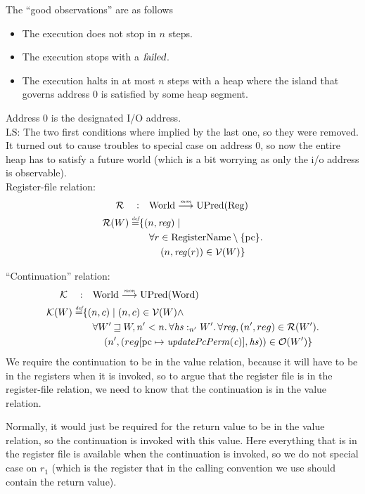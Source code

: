 \documentclass{article}
\newcommand{\update}[2]{[#1 \mapsto #2]}
\newcommand{\monfun}{\stackrel{\textit{\tiny{mon}}}{\longrightarrow}}
\newcommand{\defeq}{\stackrel{\textit{\tiny{def}}}{=}}
\newcommand\lau[1]{{\color{purple} \sf \footnotesize {LS: #1}}\\}
\newcommand{\var}[1]{\mathit{#1}}
\newcommand{\hs}{\var{hs}}
\newcommand{\pcreg}{\mathrm{pc}}
\newcommand{\reg}{\var{reg}}
\newcommand{\heap}{\var{heap}}
\newcommand{\failed}{\textsl{failed}}
\newcommand{\plainfun}[2]{
  \ifthenelse{\equal{#2}{}}
             {\mathit{#1}}
             {\mathit{#1}(#2)}
}
\newcommand{\updatePcPerm}[1]{\plainfun{updatePcPerm}{#1}}
\newcommand{\future}{\mathbin{\sqsupseteq}}
\newcommand{\heapSat}[3][\heap]{#1 :_{#2} #3}
\newcommand{\asmType}{\plaindom{AsmType}}
\newcommand{\plaindom}[1]{\mathrm{#1}}
\newcommand{\Words}{\plaindom{Word}}
\newcommand{\RegName}{\plaindom{RegisterName}}
\newcommand{\Regs}{\plaindom{Reg}}
\newcommand{\Worlds}{\plaindom{World}}
\newcommand{\UPred}[1]{\plaindom{UPred}(#1)}
\newcommand{\intr}[2]{\mathcal{#1}}
\newcommand{\valueintr}[1]{\intr{V}{#1}}
\newcommand{\contintr}[1]{\intr{K}{#1}}
\newcommand{\regintr}[1]{\intr{R}{#1}}
\newcommand{\stdvr}{\valueintr{\asmType}}
\newcommand{\stdrr}{\regintr{\asmType}}
\newcommand{\stdkr}{\contintr{\asmType}}
\newcommand{\observations}{\mathcal{O}}
\newcommand{\npair}[2][n]{\left(#1,#2 \right)}
\begin{document}
The ``good observations'' are as follows
\begin{itemize}
\item The execution does not stop in $n$ steps. 
\item The execution stops with a $\failed$.
\item The execution halts in at most $n$ steps with a heap where the island that governs address 0 is satisfied by some heap segment.
\end{itemize}
Address 0 is the designated I/O address.
\\ \lau{The two first conditions where implied by the last one, so they were removed. It turned out to cause troubles to special case on address 0, so now the entire heap has to satisfy a future world (which is a bit worrying as only the i/o address is observable).}

Register-file relation:
\begin{align*}
  \stdrr \quad : & \quad \Worlds \monfun \UPred{\Regs} \\
  \stdrr(W) \defeq & \{ \npair{\reg} \mid \\
                    & \quad \forall r \in \RegName \setminus \{\pcreg\} \ldotp \\
                    & \qquad  \npair{\reg(r)} \in \stdvr(W) \}
\end{align*}

``Continuation'' relation:
\begin{align*}
  \stdkr \quad : & \quad  \Worlds \monfun \UPred{\Words} \\%
  \stdkr(W) \defeq & \{ \npair{c} \mid \npair{c} \in \stdvr(W) \land \\
                   & \quad \forall W' \future W, n' < n\ldotp %
                     \forall \heapSat[\hs]{n'}{W'} \ldotp \forall \reg, \npair[n']{reg} \in \stdrr(W') \ldotp \\
                   & \qquad \npair[n']{(reg\update{\pcreg}{\updatePcPerm{\var{c}}},\hs)} \in \observations(W') \}
\end{align*}
We require the continuation to be in the value relation, because it will have to be in the registers when it is invoked, so to argue that the register file is in the register-file relation, we need to know that the continuation is in the value relation.

Normally, it would just be required for the return value to be in the value relation, so the continuation is invoked with this value. Here everything that is in the register file is available when the continuation is invoked, so we do not special case on $r_1$ (which is the register that in the calling convention we use should contain the return value). 
\end{document}

